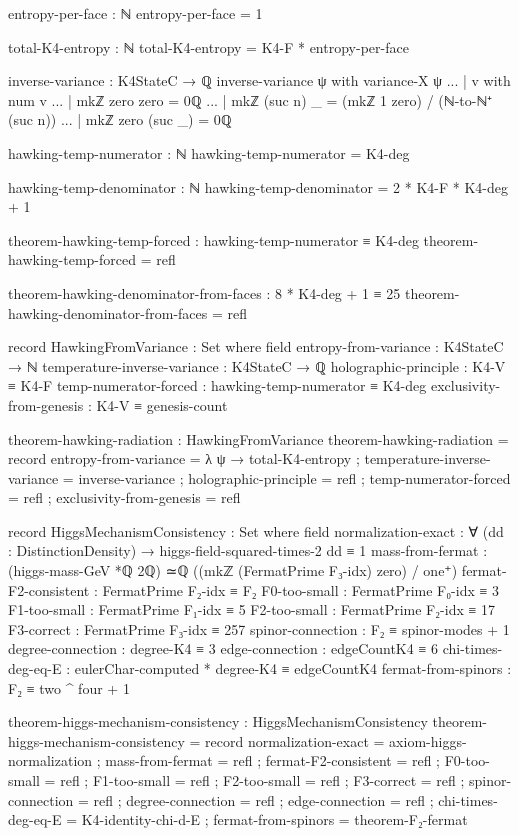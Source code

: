 \documentclass[11pt,a4paper]{book}
\begin{document}
\begin{code}
entropy-per-face : ℕ
entropy-per-face = 1

total-K4-entropy : ℕ
total-K4-entropy = K4-F * entropy-per-face

inverse-variance : K4StateC → ℚ
inverse-variance ψ with variance-X ψ
... | v with num v
...   | mkℤ zero zero = 0ℚ
...   | mkℤ (suc n) _ = (mkℤ 1 zero) / (ℕ-to-ℕ⁺ (suc n))
...   | mkℤ zero (suc _) = 0ℚ

hawking-temp-numerator : ℕ
hawking-temp-numerator = K4-deg

hawking-temp-denominator : ℕ
hawking-temp-denominator = 2 * K4-F * K4-deg + 1

theorem-hawking-temp-forced : hawking-temp-numerator ≡ K4-deg
theorem-hawking-temp-forced = refl

theorem-hawking-denominator-from-faces : 8 * K4-deg + 1 ≡ 25
theorem-hawking-denominator-from-faces = refl

record HawkingFromVariance : Set where
  field
    entropy-from-variance : K4StateC → ℕ
    temperature-inverse-variance : K4StateC → ℚ
    holographic-principle : K4-V ≡ K4-F
    temp-numerator-forced : hawking-temp-numerator ≡ K4-deg
    exclusivity-from-genesis : K4-V ≡ genesis-count

theorem-hawking-radiation : HawkingFromVariance
theorem-hawking-radiation = record
  { entropy-from-variance = λ ψ → total-K4-entropy
  ; temperature-inverse-variance = inverse-variance
  ; holographic-principle = refl
  ; temp-numerator-forced = refl
  ; exclusivity-from-genesis = refl
  }

record HiggsMechanismConsistency : Set where
  field
    normalization-exact : ∀ (dd : DistinctionDensity) → 
                          higgs-field-squared-times-2 dd ≡ 1
    mass-from-fermat : (higgs-mass-GeV *ℚ 2ℚ) ≃ℚ ((mkℤ (FermatPrime F₃-idx) zero) / one⁺)
    fermat-F2-consistent : FermatPrime F₂-idx ≡ F₂
    F0-too-small : FermatPrime F₀-idx ≡ 3
    F1-too-small : FermatPrime F₁-idx ≡ 5
    F2-too-small : FermatPrime F₂-idx ≡ 17
    F3-correct : FermatPrime F₃-idx ≡ 257
    spinor-connection : F₂ ≡ spinor-modes + 1
    degree-connection : degree-K4 ≡ 3
    edge-connection : edgeCountK4 ≡ 6
    chi-times-deg-eq-E : eulerChar-computed * degree-K4 ≡ edgeCountK4
    fermat-from-spinors : F₂ ≡ two ^ four + 1

theorem-higgs-mechanism-consistency : HiggsMechanismConsistency
theorem-higgs-mechanism-consistency = record
  { normalization-exact = axiom-higgs-normalization
  ; mass-from-fermat = refl
  ; fermat-F2-consistent = refl
  ; F0-too-small = refl
  ; F1-too-small = refl
  ; F2-too-small = refl
  ; F3-correct = refl
  ; spinor-connection = refl
  ; degree-connection = refl
  ; edge-connection = refl
  ; chi-times-deg-eq-E = K4-identity-chi-d-E
  ; fermat-from-spinors = theorem-F₂-fermat
  }


\end{code}
\end{document}
